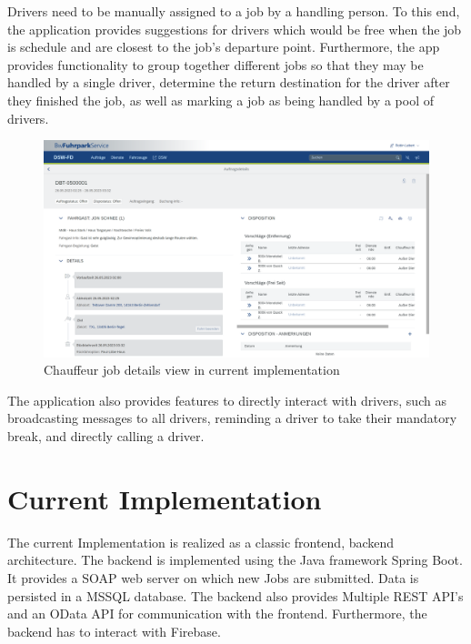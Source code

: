 Drivers need to be manually assigned to a job by a handling person. To this end, the application provides suggestions for drivers which would be free when the job is schedule and are closest to the job's departure point. Furthermore, the app provides functionality to group together different jobs so that they may be handled by a single driver, determine the return destination for the driver after they finished the job, as well as marking a job as being handled by a pool of drivers.

\begin{figure}
    \centering
    \includegraphics[width=\linewidth]{assets/current-auftrag-details}
    \caption{Chauffeur job details view in current implementation}
    \label{fig:current-details-auftrag}
\end{figure}

The application also provides features to directly interact with drivers, such as broadcasting messages to all drivers, reminding a driver to take their mandatory break, and directly calling a driver.

\section{Current Implementation}


The current Implementation is realized as a classic frontend, backend architecture. The backend is implemented using the Java framework Spring Boot. It provides a SOAP web server on which new Jobs are submitted. Data is persisted in a MSSQL database. The backend also provides Multiple REST API's and an OData API for communication with the frontend. Furthermore, the backend has to interact with Firebase.

